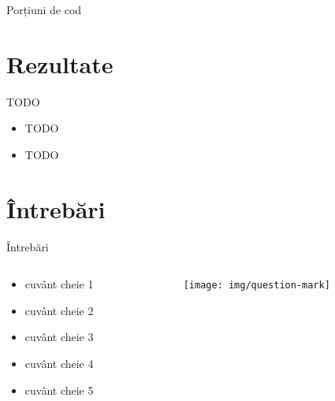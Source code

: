 \documentclass{beamer}
\begin{document}
\begin{frame}{Porțiuni de cod}
	
\end{frame}
	
\section{Rezultate}

\begin{frame}{TODO}
	\begin{itemize}
		\item TODO
		\item TODO
	\end{itemize}
\end{frame}

\section{\^{I}ntrebări}

\begin{frame}{Întrebări}
  \begin{columns}
    \begin{column}[t]{0.5\textwidth}
      \begin{itemize}
        \item cuvânt cheie 1
        \item cuvânt cheie 2
        \item cuvânt cheie 3
        \item cuvânt cheie 4
        \item cuvânt cheie 5
      \end{itemize}
    \end{column}
    \begin{column}[c]{0.5\textwidth}
      \begin{figure}
        \texttt{[image: img/question-mark]}
      \end{figure}
    \end{column}
  \end{columns}
\end{frame}
\end{document}
